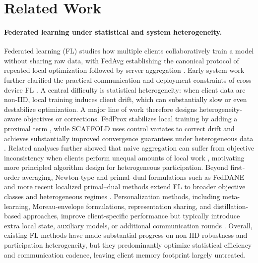 \section{Related Work}

\paragraph{Federated learning under statistical and system heterogeneity.}
Federated learning (FL) studies how multiple clients collaboratively train a model without sharing raw data, with FedAvg establishing the canonical protocol of repeated local optimization followed by server aggregation \cite{mcmahan2016fedavg}. Early system work further clarified the practical communication and deployment constraints of cross-device FL \cite{konevcny2016communication,bonawitz2016practical}. A central difficulty is statistical heterogeneity: when client data are non-IID, local training induces client drift, which can substantially slow or even destabilize optimization. A major line of work therefore designs heterogeneity-aware objectives or corrections. FedProx stabilizes local training by adding a proximal term \cite{li2018fedprox}, while SCAFFOLD uses control variates to correct drift and achieves substantially improved convergence guarantees under heterogeneous data \cite{karimireddy2019scaffold}. Related analyses further showed that naive aggregation can suffer from objective inconsistency when clients perform unequal amounts of local work \cite{wang2020objective}, motivating more principled algorithm design for heterogeneous participation. Beyond first-order averaging, Newton-type and primal--dual formulations such as FedDANE and more recent localized primal--dual methods extend FL to broader objective classes and heterogeneous regimes \cite{li2019feddane,tyou2024localgecl,zhou2025fedcanon}. Personalization methods, including meta-learning, Moreau-envelope formulations, representation sharing, and distillation-based approaches, improve client-specific performance but typically introduce extra local state, auxiliary models, or additional communication rounds \cite{fallah2020perfedavg,dinh2020pfedme,collins2021exploiting,jeong2018federated}. Overall, existing FL methods have made substantial progress on non-IID robustness and participation heterogeneity, but they predominantly optimize statistical efficiency and communication cadence, leaving client memory footprint largely untreated.

